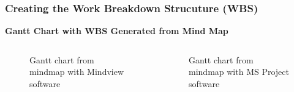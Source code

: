 \documentclass{beamer}
\begin{document}
\begin{frame}
\frametitle{Creating the Work Breakdown Strucuture (WBS)}
\textbf{Gantt Chart with WBS Generated from Mind Map}
\begin{columns}
\begin{figure}
\caption{Gantt chart from mindmap with Mindview software}
\end{figure}
\begin{figure}
\caption{Gantt chart from mindmap with MS Project software}
\end{figure}
\end{columns}
\end{frame}

\end{document}
